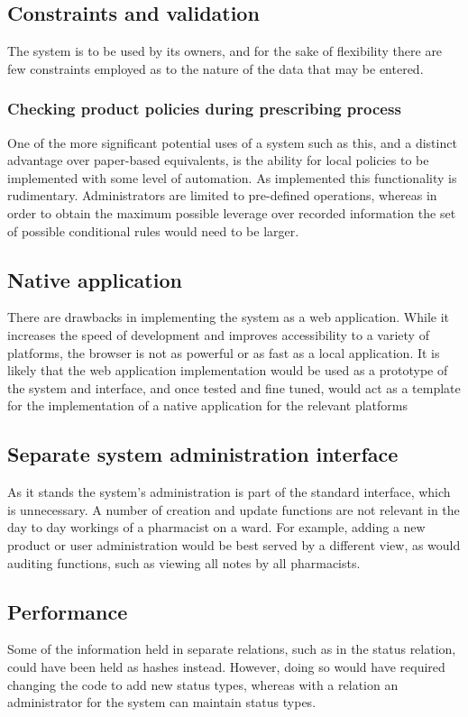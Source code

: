 \documentclass[letterpaper]{amsart}
\begin{document}
\subsection{Constraints and validation}
The system is to be used by its owners, and for the sake of flexibility there are few constraints employed as to the nature of the data that may be entered.  
\subsubsection{Checking product policies during prescribing process}
One of the more significant potential uses of a system such as this, and a distinct advantage over paper-based equivalents, is the ability for local policies to be implemented with some level of automation.  As implemented this functionality is rudimentary.  Administrators are limited to pre-defined operations, whereas in order to obtain the maximum possible leverage over recorded information the set of possible conditional rules would need to be larger.
\subsection{Native application}
There are drawbacks in implementing the system as a web application.  While it increases the speed of development and improves accessibility to a variety of platforms, the browser is not as powerful or as fast as a local application.  It is likely that the web application implementation would be used as a prototype of the system and interface, and once tested and fine tuned, would act as a template for the implementation of a native application for the relevant platforms
\subsection{Separate system administration interface}
As it stands the system's administration is part of the standard interface, which is unnecessary.  A number of creation and update functions are not relevant in the day to day workings of a pharmacist on a ward.  For example, adding a new product or user administration would be best served by a different view, as would auditing functions, such as viewing all notes by all pharmacists.
\subsection{Performance}
Some of the information held in separate relations, such as in the status relation, could have been held as hashes instead.  However, doing so would have required changing the code to add new status types, whereas with a relation an administrator for the system can maintain status types.
\end{document}
